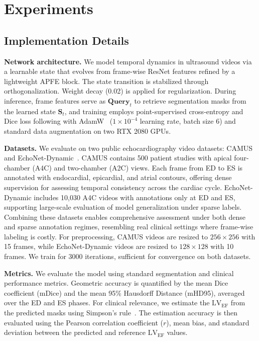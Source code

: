 \section{Experiments}
    \label{sec:experiments}

\subsection{Implementation Details}

\noindent
\textbf{Network architecture.}
We model temporal dynamics in ultrasound videos via a learnable state that evolves from frame-wise ResNet features refined by a lightweight APFE block. 
The state transition is stabilized through orthogonalization. 
Weight decay (0.02) is applied for regularization. 
During inference, frame features serve as $\mathbf{Query}_t$ to retrieve segmentation masks from the learned state $\mathbf{S}_t$, and training employs point-supervised cross-entropy and Dice loss following \cite{Liu_2025_CVPR,ICCV25_gdkvm} with AdamW~\cite{loshchilov2018decoupled_adamw} ($1\times10^{-4}$ learning rate, batch size $6$) and standard data augmentation on two RTX 2080 GPUs.

\noindent
\textbf{Datasets.}
We evaluate \mymodel on two public echocardiography video datasets: CAMUS~\cite{tmi19_camus} and EchoNet-Dynamic~\cite{nature20_echodynamic}. 
CAMUS contains 500 patient studies with apical four-chamber (A4C) and two-chamber (A2C) views.
Each frame from ED to ES is annotated with endocardial, epicardial, and atrial contours, offering dense supervision for assessing temporal consistency across the cardiac cycle. 
EchoNet-Dynamic includes 10,030 A4C videos with annotations only at ED and ES, supporting large-scale evaluation of model generalization under sparse labels. 
Combining these datasets enables comprehensive assessment under both dense and sparse annotation regimes, resembling real clinical settings where frame-wise labeling is costly. 
For preprocessing, CAMUS videos are resized to $256 \times 256$ with 15 frames, while EchoNet-Dynamic videos are resized to $128 \times 128$ with 10 frames.
We train \mymodel for 3000 iterations, sufficient for convergence on both datasets.

\noindent
\textbf{Metrics.}
We evaluate the model using standard segmentation and clinical performance metrics.
Geometric accuracy is quantified by the mean Dice coefficient (mDice) and the mean 95\% Hausdorff Distance (mHD95), averaged over the ED and ES phases.
For clinical relevance, we estimate the $\text{LV}_{\text{EF}}$ from the predicted masks using Simpson’s rule~\cite{LANG20151}.
The estimation accuracy is then evaluated using the Pearson correlation coefficient ($r$), mean bias, and standard deviation between the predicted and reference $\text{LV}_{\text{EF}}$ values.